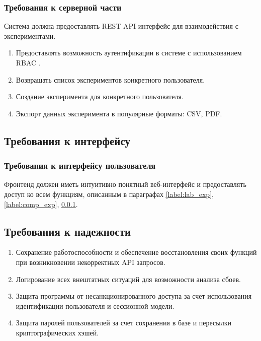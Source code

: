 \documentclass[a4paper,12pt,reqno]{article}
\begin{document}
    \subsubsection{Требования к серверной части} \label{"lable:backend"}
    Система должна предоставлять REST API \cite{technologies:REST} интерфейс для взаимодействия с экспериментами.
    \begin{enumerate}
        \item Предоставлять возможность аутентификации в системе с использованием RBAC \cite{arch:RBAC}.
        \item Возвращать список экспериментов конкретного пользователя.
        \item Создание эксперимента для конкретного пользователя.
        \item Экспорт данных эксперимента в популярные форматы: CSV\cite{Format:CSV}, PDF.
    \end{enumerate}

    \subsection{Требования к интерфейсу}

    \subsubsection{Требования к интерфейсу пользователя}
    Фронтенд должен иметь интуитивно понятный веб-интерфейс и предоставлять доступ ко всем функциям, описанным в параграфах \ref{label:lab_exp}, \ref{label:comp_exp}, \ref{"lable:backend"}.

    \subsection{Требования к надежности}
    \begin{enumerate}
        \item Сохранение работоспособности и обеспечение восстановления своих функций при возникновении некорректных API запросов.
        \item Логирование всех внештатных ситуаций для возможности анализа сбоев.
        \item Защита программы от несанкционированного доступа за счет использования идентификации пользователя и сессионной модели.
        \item Защита паролей пользователей за счет сохранения в базе и пересылки криптографических хэшей.
    \end{enumerate}
\end{document}
